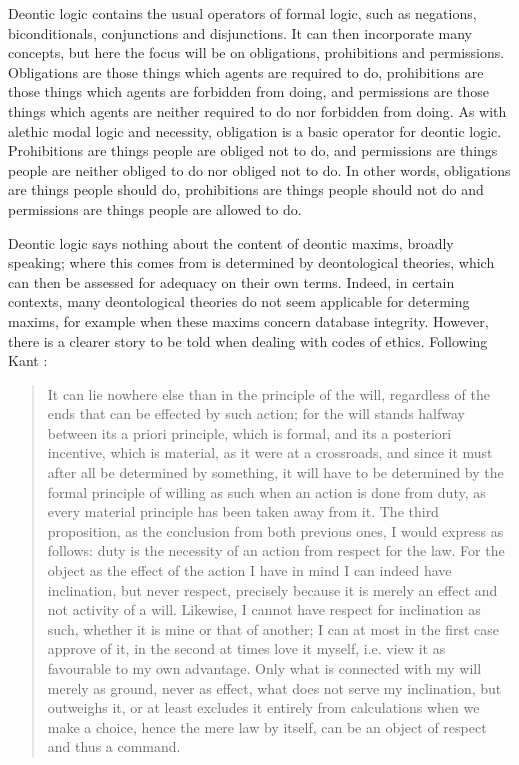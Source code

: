 \documentclass{l4proj}
\begin{document}
Deontic logic contains the usual operators of formal logic, such as negations, biconditionals, conjunctions and disjunctions. It can then incorporate many concepts, but here the focus will be on obligations, prohibitions and permissions. Obligations are those things which agents are required to do, prohibitions are those things which agents are forbidden from doing, and permissions are those things which agents are neither required to do nor forbidden from doing. As with alethic modal logic and necessity, obligation is a basic operator for deontic logic. Prohibitions are things people are obliged not to do, and permissions are things people are neither obliged to do nor obliged not to do. In other words, obligations are things people should do, prohibitions are things people should not do and permissions are things people are allowed to do. 

Deontic logic says nothing about the content of deontic maxims, broadly speaking; where this comes from is determined by deontological theories, which can then be assessed for adequacy on their own terms. Indeed, in certain contexts, many deontological theories do not seem applicable for determing maxims, for example when these maxims concern database integrity. However, there is a clearer story to be told when dealing with codes of ethics. Following Kant \cite{groundwork}: 

\blockquote{It can lie nowhere else than in the principle of the will, regardless of the ends that can be effected by such action; for the will stands halfway between its a priori principle, which is formal, and its a posteriori incentive, which is material, as it were at a crossroads, and since it must after all be determined by something, it will have to be determined by the formal principle of willing as such when an action is done from duty, as every material principle has been taken away from it. The third proposition, as the conclusion from both previous ones, I would express as follows: duty is the necessity of an action from respect for the law. For the object as the effect of the action I have in mind I can indeed have inclination, but never respect, precisely because it is merely an effect and not activity of a will. Likewise, I cannot have respect for inclination as such, whether it is mine or that of another; I can at most in the first case approve of it, in the second at times love it myself, i.e. view it as favourable to my own advantage. Only what is connected with my will merely as ground, never as effect, what does not serve my inclination, but outweighs it, or at least excludes it entirely from calculations when we make a choice, hence the mere law by itself, can be an object of respect and thus a command.}
\end{document}
